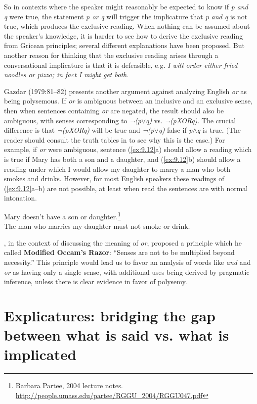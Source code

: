 So in contexts where the speaker might reasonably be expected to know if \textit{p and q} were true, the statement \textit{p or q} will trigger the implicature that \textit{p and q} is not true, which produces the exclusive reading. When nothing can be assumed about the speaker’s knowledge, it is harder to see how to derive the exclusive reading from Gricean principles; several different explanations have been proposed. But another reason for thinking that the exclusive reading arises through a conversational implicature is that it is defeasible, e.g. \textit{I will order either fried noodles or pizza; in fact I might get both}.



Gazdar (1979:81–82) presents another argument against analyzing English \textit{or} as being polysemous. If \textit{or} is ambiguous between an inclusive and an exclusive sense, then when sentences containing \textit{or} are negated, the result should also be ambiguous, with senses corresponding to \textit{¬(p$\vee$q)} vs. \textit{¬(pXORq)}. The crucial difference is that \textit{¬(pXORq)} will be true and \textit{¬(p$\vee$q)} false if \textit{p$\wedge$q} is true. (The reader should consult the truth tables in  to see why this is the case.) For example, if \textit{or} were ambiguous, sentence (\ref{ex:9.12}a) should allow a reading which is true if Mary has both a son and a daughter, and (\ref{ex:9.12}b) should allow a reading under which I would allow my daughter to marry a man who both smokes and drinks. However, for most English speakers these readings of (\ref{ex:9.12}a--b) are not possible, at least when read the sentences are with normal intonation.

 
\ea \label{ex:9.12}
\ea Mary doesn’t have a son or daughter.\footnote{Barbara Partee, 2004 lecture notes. \url{http://people.umass.edu/partee/RGGU_2004/RGGU047.pdf}} \\
\ex The man who marries my daughter must not smoke or drink.
                       \z
\z


\citet[47]{Grice1978}, in the context of discussing the meaning of \textit{or}, proposed a principle which he called \textbf{Modified Occam’s Razor}: “Senses are not to be multiplied beyond necessity.” This principle would lead us to favor an analysis of words like \textit{and} and \textit{or} as having only a single sense, with additional uses being derived by pragmatic inference, unless there is clear evidence in favor of polysemy.


\section{Explicatures: bridging the gap between what is said vs. what is implicated}\label{sec:} %

